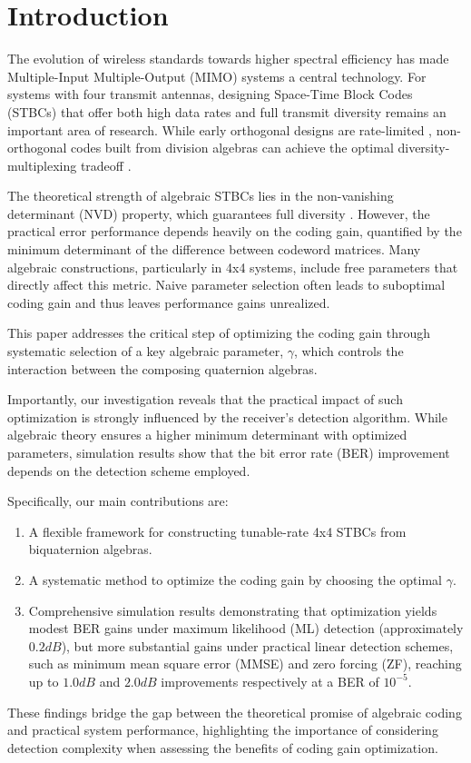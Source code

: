 \section{Introduction}
The evolution of wireless standards towards higher spectral efficiency has made Multiple-Input Multiple-Output (MIMO) systems a central technology. 
For systems with four transmit antennas, designing Space-Time Block Codes (STBCs) that offer both high data rates and full transmit diversity remains an important area of research. 
While early orthogonal designs are rate-limited \cite{1}, non-orthogonal codes built from division algebras can achieve the optimal diversity-multiplexing tradeoff \cite{2,3}.

The theoretical strength of algebraic STBCs lies in the non-vanishing determinant (NVD) property, which guarantees full diversity \cite{4}. However, the practical error performance depends heavily on the coding gain, quantified by the minimum determinant of the difference between codeword matrices. 
Many algebraic constructions, particularly in 4x4 systems, include free parameters that directly affect this metric. 
Naive parameter selection often leads to suboptimal coding gain and thus leaves performance gains unrealized.

This paper addresses the critical step of optimizing the coding gain through systematic selection of a key algebraic parameter, \(\gamma\), which controls the interaction between the composing quaternion algebras.

Importantly, our investigation reveals that the practical impact of such optimization is strongly influenced by the receiver's detection algorithm. 
While algebraic theory ensures a higher minimum determinant with optimized parameters, simulation results show that the bit error rate (BER) improvement depends on the detection scheme employed.

Specifically, our main contributions are:
\begin{enumerate}
    \item A flexible framework for constructing tunable-rate 4x4 STBCs from biquaternion algebras.
    \item A systematic method to optimize the coding gain by choosing the optimal \(\gamma\).
    \item Comprehensive simulation results demonstrating that optimization yields modest BER gains under maximum likelihood (ML) detection (approximately $0.2 dB$), but more substantial gains under practical linear detection schemes, such as minimum mean square error (MMSE) and zero forcing (ZF), reaching up to $1.0 dB$ and $2.0 dB$ improvements respectively at a BER of \(10^{-5}\).
\end{enumerate}

These findings bridge the gap between the theoretical promise of algebraic coding and practical system performance, highlighting the importance of considering detection complexity when assessing the benefits of coding gain optimization.
